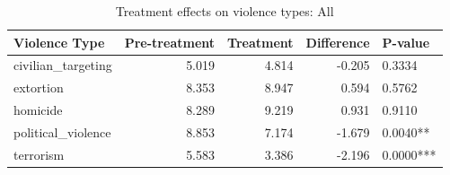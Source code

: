\begin{table}

\caption{\label{tab:tab:treatment_all}Treatment effects on violence types: All}
\centering
\begin{tabular}[t]{lrrrl}
\toprule
Violence Type & Pre-treatment & Treatment & Difference & P-value\\
\midrule
civilian\_targeting & 5.019 & 4.814 & -0.205 & 0.3334\\
extortion & 8.353 & 8.947 & 0.594 & 0.5762\\
homicide & 8.289 & 9.219 & 0.931 & 0.9110\\
political\_violence & 8.853 & 7.174 & -1.679 & 0.0040**\\
terrorism & 5.583 & 3.386 & -2.196 & 0.0000***\\
\bottomrule
\end{tabular}
\end{table}
